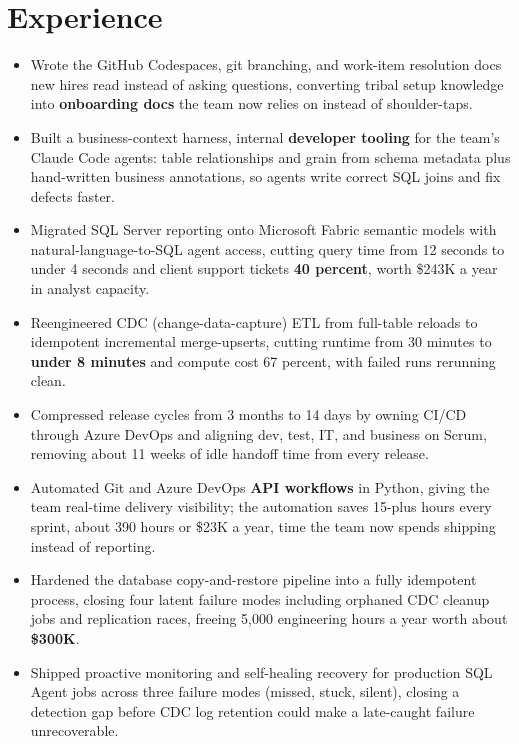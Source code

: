 \documentclass[letterpaper,10pt]{article}
\begin{document}
\section{Experience}
\begin{itemize}
\item Wrote the GitHub Codespaces, git branching, and work-item resolution docs new hires read instead of asking questions, converting tribal setup knowledge into \textbf{onboarding docs} the team now relies on instead of shoulder-taps.
\item Built a business-context harness, internal \textbf{developer tooling} for the team's Claude Code agents: table relationships and grain from schema metadata plus hand-written business annotations, so agents write correct SQL joins and fix defects faster.
\item Migrated SQL Server reporting onto Microsoft Fabric semantic models with natural-language-to-SQL agent access, cutting query time from 12 seconds to under 4 seconds and client support tickets \textbf{40 percent}, worth \$243K a year in analyst capacity.
\item Reengineered CDC (change-data-capture) ETL from full-table reloads to idempotent incremental merge-upserts, cutting runtime from 30 minutes to \textbf{under 8 minutes} and compute cost 67 percent, with failed runs rerunning clean.
\item Compressed release cycles from 3 months to 14 days by owning CI/CD through Azure DevOps and aligning dev, test, IT, and business on Scrum, removing about 11 weeks of idle handoff time from every release.
\item Automated Git and Azure DevOps \textbf{API workflows} in Python, giving the team real-time delivery visibility; the automation saves 15-plus hours every sprint, about 390 hours or \$23K a year, time the team now spends shipping instead of reporting.
\item Hardened the database copy-and-restore pipeline into a fully idempotent process, closing four latent failure modes including orphaned CDC cleanup jobs and replication races, freeing 5,000 engineering hours a year worth about \textbf{\$300K}.
\item Shipped proactive monitoring and self-healing recovery for production SQL Agent jobs across three failure modes (missed, stuck, silent), closing a detection gap before CDC log retention could make a late-caught failure unrecoverable.
\end{itemize}
\end{document}
